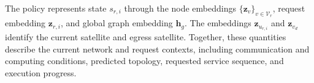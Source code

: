 \documentclass[10pt, conference, letterpaper]{IEEEtran}
\begin{document}

The policy represents state $s_{r,i}$ through the node embeddings $\{\mathbf z_v\}_{v\in\mathcal V_r}$, request embedding $\mathbf z_{r,i}$, and global graph embedding $\mathbf h_g$. The embeddings $\mathbf z_{u_{r,i}}$ and $\mathbf z_{v_d}$ identify the current satellite and egress satellite. Together, these quantities describe the current network and request contexts, including communication and computing conditions, predicted topology, requested service sequence, and execution progress.
\end{document}
